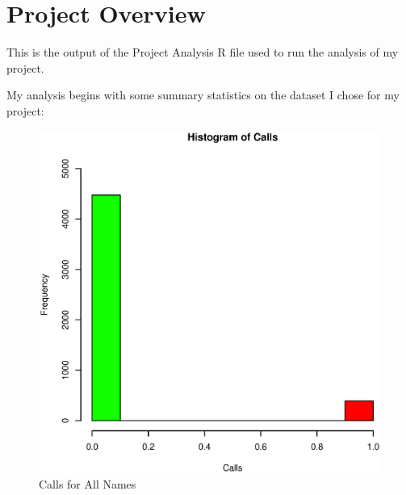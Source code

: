 \documentclass{paper}
\begin{document}


\section{Project Overview}
This is the output of the Project Analysis R file used to run the analysis of my project.


My analysis begins with some summary statistics on the dataset I chose for my project:


\begin{figure}
\centering
\includegraphics[width=\textwidth]{../Figures/HistogramCallsforAllNames.eps}
\caption{Calls for All Names}
\label{fig:allcalls}
\end{figure}
\end{document}
